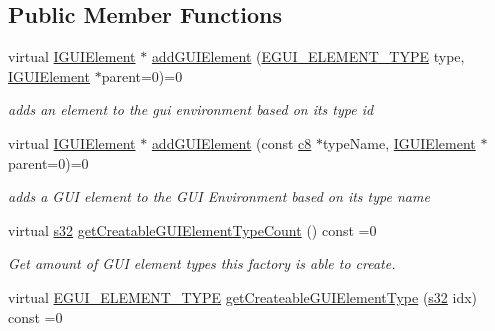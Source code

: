 \subsection*{Public Member Functions}
\begin{DoxyCompactItemize}
\item 
virtual \hyperlink{classirr_1_1gui_1_1IGUIElement}{I\+G\+U\+I\+Element} $\ast$ \hyperlink{classirr_1_1gui_1_1IGUIElementFactory_aaaa0dda5493286ff745310b441347019}{add\+G\+U\+I\+Element} (\hyperlink{namespaceirr_1_1gui_ae4d66df0ecf4117cdbcf9f22404bd254}{E\+G\+U\+I\+\_\+\+E\+L\+E\+M\+E\+N\+T\+\_\+\+T\+Y\+PE} type, \hyperlink{classirr_1_1gui_1_1IGUIElement}{I\+G\+U\+I\+Element} $\ast$parent=0)=0
\begin{DoxyCompactList}\small\item\em adds an element to the gui environment based on its type id \end{DoxyCompactList}\item 
virtual \hyperlink{classirr_1_1gui_1_1IGUIElement}{I\+G\+U\+I\+Element} $\ast$ \hyperlink{classirr_1_1gui_1_1IGUIElementFactory_aec55be9ef891ba1b19c5d9c5a85130a4}{add\+G\+U\+I\+Element} (const \hyperlink{namespaceirr_a9395eaea339bcb546b319e9c96bf7410}{c8} $\ast$type\+Name, \hyperlink{classirr_1_1gui_1_1IGUIElement}{I\+G\+U\+I\+Element} $\ast$parent=0)=0
\begin{DoxyCompactList}\small\item\em adds a G\+UI element to the G\+UI Environment based on its type name \end{DoxyCompactList}\item 
\mbox{\label{classirr_1_1gui_1_1IGUIElementFactory_aae56378de5264978e70d11a36fff02e9}} 
virtual \hyperlink{namespaceirr_ac66849b7a6ed16e30ebede579f9b47c6}{s32} \hyperlink{classirr_1_1gui_1_1IGUIElementFactory_aae56378de5264978e70d11a36fff02e9}{get\+Creatable\+G\+U\+I\+Element\+Type\+Count} () const =0
\begin{DoxyCompactList}\small\item\em Get amount of G\+UI element types this factory is able to create. \end{DoxyCompactList}\item 
virtual \hyperlink{namespaceirr_1_1gui_ae4d66df0ecf4117cdbcf9f22404bd254}{E\+G\+U\+I\+\_\+\+E\+L\+E\+M\+E\+N\+T\+\_\+\+T\+Y\+PE} \hyperlink{classirr_1_1gui_1_1IGUIElementFactory_a9318ddb2d0d971551db4c050c3f99a2f}{get\+Createable\+G\+U\+I\+Element\+Type} (\hyperlink{namespaceirr_ac66849b7a6ed16e30ebede579f9b47c6}{s32} idx) const =0

\end{DoxyCompactItemize}

